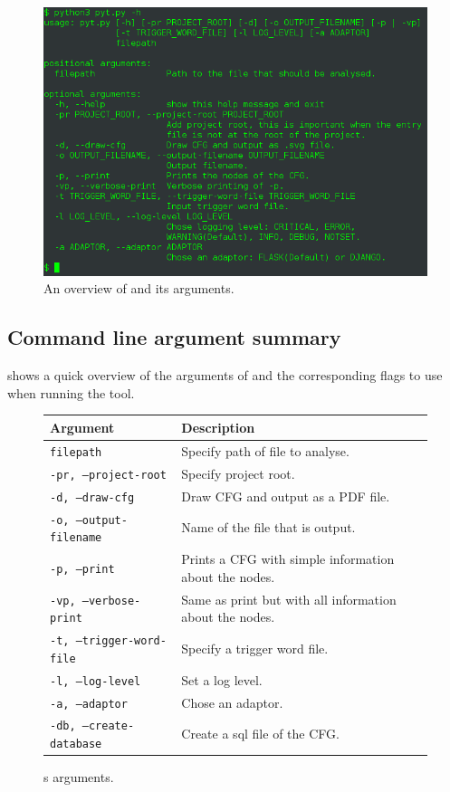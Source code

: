 \begin{figure}
  \includegraphics[width=\textwidth]{./figures/pyt_overview.png}
  \caption{An overview of \pyt{} and its arguments.}
  \label{tool_overview}
\end{figure}


\subsection{Command line argument summary}
 shows a quick overview of the arguments of \pyt{} and the corresponding flags to use when running the tool.

\newcommand{\pytarg}[2]{
  \texttt{#1} & #2.
}
\begin{figure}
  \begin{tabular}{l | l}
    \textbf{Argument} & \textbf{Description} \\
    \hline
    \pytarg{filepath}{Specify path of file to analyse} \\
    \pytarg{-pr, --project-root}{Specify project root} \\
    \pytarg{-d, --draw-cfg}{Draw CFG and output as a PDF file} \\
    \pytarg{-o, --output-filename}{Name of the file that is output} \\
    \pytarg{-p, --print}{Prints a CFG with simple information about the nodes} \\
    \pytarg{-vp, --verbose-print}{Same as print but with all information about the nodes} \\
    \pytarg{-t, --trigger-word-file}{Specify a trigger word file} \\
    \pytarg{-l, --log-level}{Set a log level} \\
    \pytarg{-a, --adaptor}{Chose an adaptor} \\
    \pytarg{-db, --create-database}{Create a sql file of the CFG} \\
    
\end{tabular}
  \centering
  \caption{\pyt{}s arguments.}
  \label{pyt:arguments_overview}
\end{figure}

